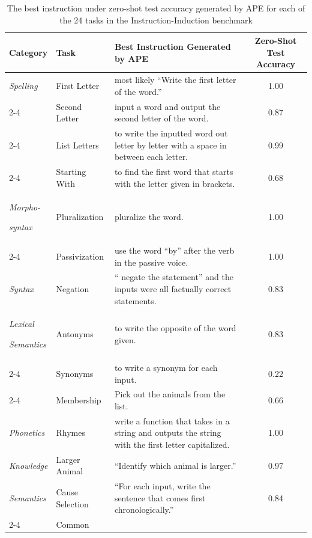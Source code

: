 \clearpage
\begin{table}[H]
\caption{The best instruction under zero-shot test accuracy generated by APE for each of the 24 tasks in the Instruction-Induction benchmark}
\label{table:best_instructions_all}
\small
\centering
\begin{tabular}{@{}p{}@{}p{}@{}p{}c}
\toprule
\textbf{Category}                           & \textbf{Task}           & \textbf{Best Instruction Generated by APE}                                             & \textbf{Zero-Shot Test Accuracy} \\
\midrule
\textit{Spelling} & First Letter & most likely ``Write the first letter of the word.'' & 1.00 \\
\cmidrule{2-4}
 & Second Letter & input a word and output the second letter of the word. & 0.87\\
\cmidrule{2-4}
 & List Letters & to write the inputted word out letter by letter with a space in between each letter. & 0.99\\
\cmidrule{2-4}
& Starting With & to find the first word that starts with the letter given in brackets.	 & 0.68 \\
\midrule
\textit{Morpho-}

\textit{syntax} & Pluralization  &  pluralize the word.	& 1.00 \\
\cmidrule{2-4} 
                                   & Passivization  & use the word ``by'' after the verb in the passive voice.
& 1.00\\
\midrule
\textit{Syntax}                             & Negation       & `` negate the statement'' and the inputs were all \mbox{factually} correct statements. &	0.83\\
\midrule
\textit{Lexical} 

\textit{Semantics} & Antonyms       & to write the opposite of the word given.	&0.83\\
\cmidrule{2-4}
                                   & Synonyms       &  to write a synonym for each input.	& 0.22\\
\cmidrule{2-4}
                                   & Membership    & Pick out the animals from the list.
	& 0.66\\
\midrule
\textit{Phonetics}                          & Rhymes         & write a function that takes in a string and outputs the string with the first letter capitalized.	& 1.00\\
\midrule
\textit{Knowledge}                    & Larger Animal  &  ``Identify which animal is larger.''	&0.97\\
\midrule
\textit{Semantics} & Cause Selection &  ``For each input, write the sentence that comes first chronologically.''	& 0.84\\
\cmidrule{2-4}
& Common


\end{tabular}
\end{table}
